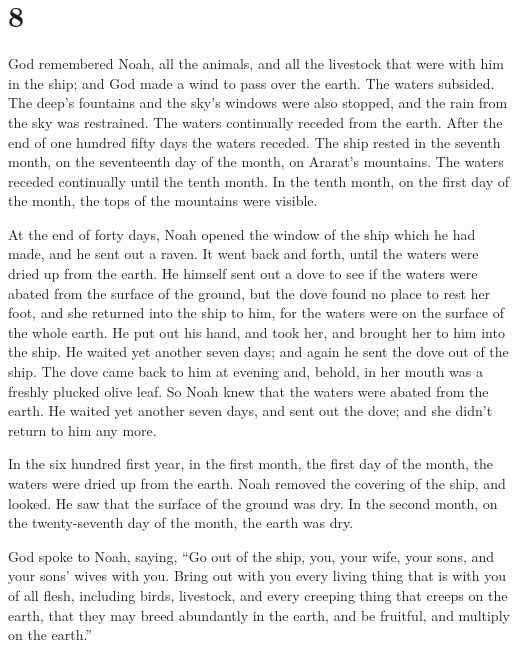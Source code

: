 \hypertarget{section-7}{%
\section{8}\label{section-7}}

 God remembered Noah, all the animals, and all the livestock
that were with him in the ship; and God made a wind to pass over the
earth. The waters subsided.  The deep's fountains and the
sky's windows were also stopped, and the rain from the sky was
restrained.  The waters continually receded from the earth.
After the end of one hundred fifty days the waters receded. 
The ship rested in the seventh month, on the seventeenth day of the
month, on Ararat's mountains.  The waters receded
continually until the tenth month. In the tenth month, on the first day
of the month, the tops of the mountains were visible.

 At the end of forty days, Noah opened the window of the
ship which he had made,  and he sent out a raven. It went
back and forth, until the waters were dried up from the earth.
 He himself sent out a dove to see if the waters were abated
from the surface of the ground,  but the dove found no place
to rest her foot, and she returned into the ship to him, for the waters
were on the surface of the whole earth. He put out his hand, and took
her, and brought her to him into the ship.  He waited yet
another seven days; and again he sent the dove out of the ship.
 The dove came back to him at evening and, behold, in her
mouth was a freshly plucked olive leaf. So Noah knew that the waters
were abated from the earth.  He waited yet another seven
days, and sent out the dove; and she didn't return to him any more.

 In the six hundred first year, in the first month, the
first day of the month, the waters were dried up from the earth. Noah
removed the covering of the ship, and looked. He saw that the surface of
the ground was dry.  In the second month, on the
twenty-seventh day of the month, the earth was dry.

 God spoke to Noah, saying,  ``Go out of the
ship, you, your wife, your sons, and your sons' wives with you.
 Bring out with you every living thing that is with you of
all flesh, including birds, livestock, and every creeping thing that
creeps on the earth, that they may breed abundantly in the earth, and be
fruitful, and multiply on the earth.''

